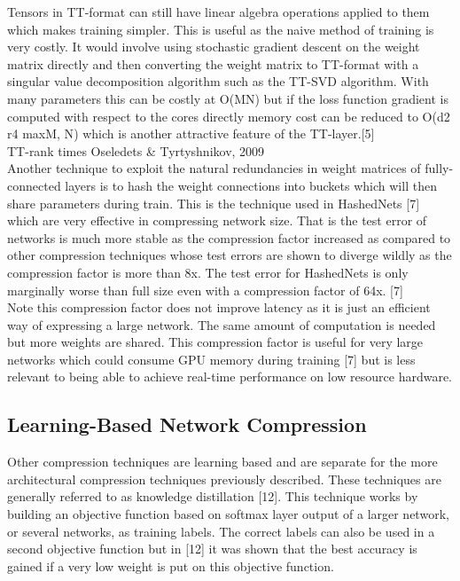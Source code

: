 \documentclass{article}
\begin{document}
Tensors in TT-format can still have linear algebra operations applied to them which makes training simpler. This is useful as the naive method of training is very costly. It would involve using stochastic gradient descent on the weight matrix directly and then converting the weight matrix to TT-format with a singular value decomposition algorithm such as the TT-SVD algorithm. With many parameters this can be costly at O(MN) but if the loss function gradient is computed with respect to the cores directly memory cost can be reduced to O(d2 r4 max{M, N}) which is another attractive feature of the TT-layer.[5]\\

TT-rank times Oseledets \& Tyrtyshnikov, 2009\\

Another technique to exploit the natural redundancies in weight matrices of fully-connected layers is to hash the weight connections into buckets which will then share parameters during train. This is the technique used in HashedNets [7] which are very effective in compressing network size. That is the test error of networks is much more stable as the compression factor increased as compared to other compression techniques whose test errors are shown to diverge wildly as the compression factor is more than 8x. The test error for HashedNets is only marginally worse than full size even with a compression factor of 64x. [7]\\

Note this compression factor does not improve latency as it is just an efficient way of expressing a large network. The same amount of computation is needed but more weights are shared. This compression factor is useful for very large networks which could consume GPU memory during training [7] but is less relevant to being able to achieve real-time performance on low resource hardware. 

\subsection*{Learning-Based Network Compression}
Other compression techniques are learning based and are separate for the more architectural compression techniques previously described. These techniques are generally referred to as knowledge distillation [12]. This technique works by building an objective function based on softmax layer output of a larger network, or several networks, as training labels. The correct labels can also be used in a second objective function but in [12] it was shown that the best accuracy is gained if a very low weight is put on this objective function.\\
\end{document}
